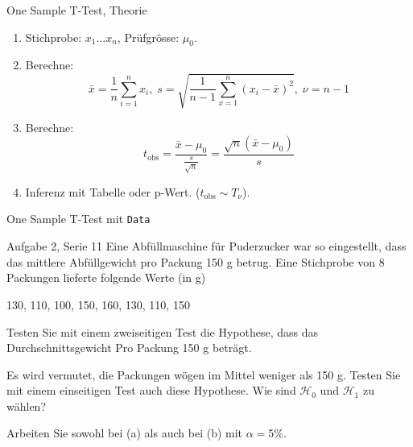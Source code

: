 \documentclass[handout]{beamer}
\begin{document}
\begin{frame}{One Sample T-Test, Theorie}
\begin{enumerate}
\item Stichprobe: $x_1\ldots x_n$, Prüfgrösse: $\mu_0$.
\item Berechne:
$$
\bar{x}=\frac{1}{n}\sum_{i=1}^n x_i,\;
s=\sqrt{\frac{1}{n-1}\sum_{x=1}^{n}(x_i-\bar{x})^2},\;
\nu=n-1
$$
\item Berechne:
$$
t_\text{obs}=\frac{\bar{x}-\mu_0}{\frac{s}{\sqrt{n}}} = 
\frac{\sqrt{n}\left(\bar{x}-\mu_0\right)}{s}
$$
\item Inferenz mit Tabelle oder p-Wert. ($t_\text{obs}\sim T_\nu$).
\end{enumerate}
\end{frame}

\begin{frame}{One Sample T-Test mit \texttt{Data}}
\begin{beamerboxesrounded}[shadow]{Aufgabe 2, Serie 11}
Eine Abfüllmaschine für Puderzucker war so eingestellt, dass das mittlere Abfüllgewicht
pro Packung 150 g betrug. Eine Stichprobe von 8 Packungen lieferte folgende Werte (in
g)

\begin{center}
130, 110, 100, 150, 160, 130, 110, 150
\end{center}

\begin{outline}
\item Testen Sie mit einem zweiseitigen Test die Hypothese, dass das
Durchschnittsgewicht Pro Packung 150 g beträgt.
\item Es  wird vermutet, die Packungen wögen im Mittel weniger als 150 g. Testen Sie
mit einem einseitigen Test auch diese Hypothese. Wie sind $\mathcal{H}_0$ und 
$\mathcal{H}_1$ zu wählen?
\end{outline}
Arbeiten Sie sowohl bei (a) als auch bei (b) mit $\alpha = 5\%$.
\end{beamerboxesrounded}
\end{frame}
\end{document}
